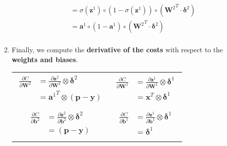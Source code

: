 \begin{enumerate}
\begin{equation}
\begin{split}
							&= \sigma(\boldsymbol{z}^1)\circ(1-\sigma(\boldsymbol{z}^1)) \circ ({\boldsymbol{W}^2}^T \cdot \boldsymbol{\delta}^2) \\
							&= \boldsymbol{a}^1 \circ(1-\boldsymbol{a}^1) \circ ({\boldsymbol{W}^2}^T \cdot \boldsymbol{\delta}^2) \\
						\end{split}
					\end{equation}
				\item Finally, we compute the \textbf{derivative of the costs} with respect to the \textbf{weights and biases}.\\
				\begin{tabular}{c|c}
					\parbox{14em}{
						\begin{equation}
							\begin{split}
								\frac{\partial C}{\partial \boldsymbol{W}^2}
								&= \frac{\partial \boldsymbol{z}^2}{\partial \boldsymbol{W}^2} \otimes {\boldsymbol{\delta}^2} \\
								&= {\boldsymbol{a}^1}^T \otimes {(\boldsymbol{p} - \boldsymbol{y})} \\
							\end{split}
							\label{eq:BP_w2}
						\end{equation}
					} & \parbox{14em}{
						\begin{equation}
							\begin{split}
								\frac{\partial C}{\partial \boldsymbol{W}^1}
								&= \frac{\partial \boldsymbol{z}^1}{\partial \boldsymbol{W}^1} \otimes {\boldsymbol{\delta}^1} \\
								&= \boldsymbol{x}^T \otimes {\boldsymbol{\delta}^1} \\
							\end{split}
							\label{eq:BP_w1}
						\end{equation}
					} \\
					\parbox{14em}{
						\begin{equation}
							\begin{split}
								\frac{\partial C}{\partial \boldsymbol{b}^2}
								&= \frac{\partial \boldsymbol{z}^2}{\partial \boldsymbol{b}^2} \otimes {\boldsymbol{\delta}^2} \\
								&= (\boldsymbol{p} - \boldsymbol{y}) \\
							\end{split}
							\label{eq:BP_b2}
						\end{equation}
					} & \parbox{14em}{
						\begin{equation}
							\begin{split}
								\frac{\partial C}{\partial \boldsymbol{b}^1}
								&= \frac{\partial \boldsymbol{z}^1}{\partial \boldsymbol{b}^1} \otimes {\boldsymbol{\delta}^1} \\
								&= \boldsymbol{\delta}^1 \\
							\end{split}
							\label{eq:BP_b1}
						\end{equation}
					}
				\end{tabular}
			\end{enumerate}




